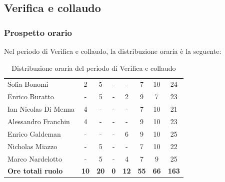 \documentclass[../piano-di-progetto.tex]{subfiles}
\begin{document}
  \subsection{Verifica e collaudo}

  \subsubsection{Prospetto orario}
  Nel periodo di Verifica e collaudo, la distribuzione oraria è la seguente:
  \begin{table}[H]
    \centering
    \begin{tabular}{lccccccc}
      Sofia Bonomi              & 2           & 5           & -          & -           & 7           & 10          & 24           \\
      Enrico Buratto            & -           & 5           & -          & 2           & 9           & 7           & 23           \\
      Ian Nicolas Di Menna      & 4           & -           & -          & -           & 7           & 10          & 21           \\
      Alessandro Franchin       & 4           & -           & -          & -           & 9           & 10          & 23           \\
      Enrico Galdeman           & -           & -           & -          & 6           & 9           & 10          & 25           \\
      Nicholas Miazzo           & -           & 5           & -          & -           & 7           & 10          & 22           \\
      Marco Nardelotto          & -           & 5           & -          & 4           & 7           & 9           & 25           \\
      \textbf{Ore totali ruolo} & \textbf{10} & \textbf{20} & \textbf{0} & \textbf{12} & \textbf{55} & \textbf{66} & \textbf{163} 
    \end{tabular}
    \caption{Distribuzione oraria del periodo di Verifica e collaudo}
  \end{table}
\end{document}
